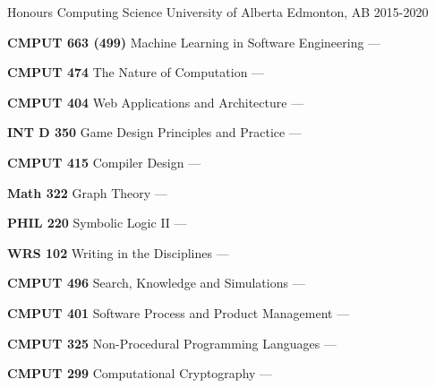 
\begin{cventries}
  \cventry
    {Honours Computing Science} %
    {University of Alberta} %
    {Edmonton, AB} %
    {2015-2020} %
    {
      \begin{cvitems} %
      \item {\textbf{CMPUT 663 (499)} Machine Learning in Software Engineering --- }
        \vspace{0.5mm}
      \item {\textbf{CMPUT 474} The Nature of Computation --- }
        \vspace{0.5mm}
      \item {\textbf{CMPUT 404} Web Applications and Architecture --- }
        \vspace{0.5mm}
      \item {\textbf{INT D 350} Game Design Principles and Practice --- }
        \vspace{1mm}
      \item {\textbf{CMPUT 415} Compiler Design --- }
        \vspace{0.5mm}
      \item {\textbf{Math 322} Graph Theory --- }
        \vspace{0.5mm}
      \item {\textbf{PHIL 220} Symbolic Logic II --- }
        \vspace{0.5mm}
      \item {\textbf{WRS 102} Writing in the Disciplines --- }
        \vspace{1mm}
      \item {\textbf{CMPUT 496} Search, Knowledge and Simulations --- }
        \vspace{0.5mm}
      \item {\textbf{CMPUT 401} Software Process and Product Management --- }
        \vspace{0.5mm}
      \item {\textbf{CMPUT 325} Non-Procedural Programming Languages --- }
        \vspace{0.5mm}
      \item {\textbf{CMPUT 299} Computational Cryptography --- }

\end{cvitems}}
\end{cventries}
